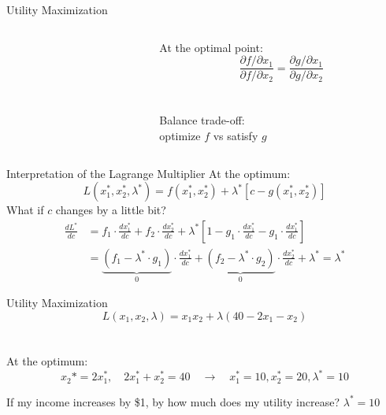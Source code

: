 \documentclass{./../../Latex/teaching_slides}
\begin{document}
\begin{frame}{Utility Maximization}
\begin{columns}[T]
\begin{column}{0.7\textwidth}
  	\centering \vspace{0.5em}
\end{column}	
\begin{column}{0.4\textwidth}
At the optimal point:
$$ \frac{\partial f / \partial x_1}{\partial f / \partial x_2} = \frac{\partial g / \partial x_1}{\partial g / \partial x_2}$$ \\~\\
Balance trade-off: \\ optimize $f$ vs satisfy $g$
\end{column}	
\end{columns}
\end{frame}

\begin{frame}{Interpretation of the Lagrange Multiplier}
At the optimum:
$$
L(x^*_1,x^*_2,\lambda^*)=f(x^*_1, x^*_2)+\lambda^*[c-g(x^*_1, x^*_2)]
$$
What if $c$ changes by a little bit? \pause
\begin{align*}
\frac{dL^*}{dc} &=f_1 \cdot \frac{d x_1^*}{dc}+ f_2 \cdot \frac{d x_2^*}{dc} + \lambda^*\left[ 1- g_1 \cdot \frac{d x_1^*}{dc}- g_1 \cdot \frac{d x_1^*}{dc} \right] \\ 
& = \underbrace{(f_1-\lambda^* \cdot g_1)}_{0} \cdot \frac{d x_1^*}{dc} + \underbrace{(f_2-\lambda^* \cdot g_2)}_{0} \cdot \frac{d x_2^*}{dc} + \lambda^* = \lambda^*
\end{align*}
\end{frame}

\begin{frame}{Utility Maximization}
$$ L(x_1, x_2, \lambda) = x_1 x_2 + \lambda(40-2x_1-x_2) $$ \\~\\

At the optimum: 
$$x_2* = 2 x_1^*, \quad 2x_1^* + x_2^* = 40 \quad \rightarrow \quad x_1^*=10, x_2^*=20, \lambda^* = 10$$

If my income increases by \$1, by how much does my utility increase? $\lambda^* = 10$
\end{frame}
\end{document}
